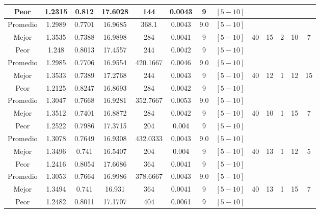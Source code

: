\begin{table}[h!]
\begin{center}
\begin{tabular}{|c|c|c|c|c|c|c|c|c|c|c|c|c|}
            \cline{1-8}
            Peor & 1.2315 & 0.812  & 17.6028 & 144 & 0.0043 & 9 & $[5-10]$ &  &  &  &  & \\
        \hline
        \hline
            Promedio  & 1.2989 & 0.7701 & 16.9685 & 368.1 & 0.0043 & 9.0 & $[5-10]$ &  &  &  &  & \\
            \cline{1-8}
            Mejor & 1.3535 & 0.7388  & 16.9898 & 284 & 0.0041 & 9 & $[5-10]$ & 40 & 15 & 2 & 10 & 7\\
            \cline{1-8}
            Peor & 1.248 & 0.8013  & 17.4557 & 244 & 0.0042 & 9 & $[5-10]$ &  &  &  &  & \\
        \hline
        \hline
            Promedio  & 1.2985 & 0.7706 & 16.9554 & 420.1667 & 0.0046 & 9.0 & $[5-10]$ &  &  &  &  & \\
            \cline{1-8}
            Mejor & 1.3533 & 0.7389  & 17.2768 & 244 & 0.0043 & 9 & $[5-10]$ & 40 & 12 & 1 & 12 & 15\\
            \cline{1-8}
            Peor & 1.2125 & 0.8247  & 16.8693 & 284 & 0.0042 & 9 & $[5-10]$ &  &  &  &  & \\
        \hline
        \hline
            Promedio  & 1.3047 & 0.7668 & 16.9281 & 352.7667 & 0.0053 & 9.0 & $[5-10]$ &  &  &  &  & \\
            \cline{1-8}
            Mejor & 1.3512 & 0.7401  & 16.8872 & 284 & 0.0042 & 9 & $[5-10]$ & 40 & 10 & 1 & 15 & 7\\
            \cline{1-8}
            Peor & 1.2522 & 0.7986  & 17.3715 & 204 & 0.004 & 9 & $[5-10]$ &  &  &  &  & \\
        \hline
        \hline
            Promedio  & 1.3078 & 0.7649 & 16.9308 & 432.0333 & 0.0043 & 9.0 & $[5-10]$ &  &  &  &  & \\
            \cline{1-8}
            Mejor & 1.3496 & 0.741  & 16.5407 & 204 & 0.004 & 9 & $[5-10]$ & 40 & 13 & 1 & 12 & 5\\
            \cline{1-8}
            Peor & 1.2416 & 0.8054  & 17.6686 & 364 & 0.0041 & 9 & $[5-10]$ &  &  &  &  & \\
        \hline
        \hline
            Promedio  & 1.3053 & 0.7664 & 16.9986 & 378.6667 & 0.0043 & 9.0 & $[5-10]$ &  &  &  &  & \\
            \cline{1-8}
            Mejor & 1.3494 & 0.741  & 16.931 & 364 & 0.0041 & 9 & $[5-10]$ & 40 & 13 & 1 & 15 & 7\\
            \cline{1-8}
            Peor & 1.2482 & 0.8011  & 17.1707 & 404 & 0.0061 & 9 & $[5-10]$ &  &  &  &  & \\

\end{tabular}
\end{center}
\end{table}
